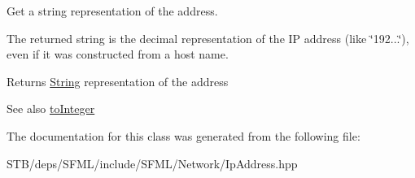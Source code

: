 Get a string representation of the address. 

The returned string is the decimal representation of the I\+P address (like \char`\"{}192...\char`\"{}), even if it was constructed from a host name.

\begin{DoxyReturn}{Returns}
\hyperlink{classsf_1_1_string}{String} representation of the address
\end{DoxyReturn}
\begin{DoxySeeAlso}{See also}
\hyperlink{classsf_1_1_ip_address_af42678b08b23def2560aed7d98b24d89}{to\+Integer} 
\end{DoxySeeAlso}


The documentation for this class was generated from the following file\+:\begin{DoxyCompactItemize}
\item 
S\+T\+B/deps/\+S\+F\+M\+L/include/\+S\+F\+M\+L/\+Network/Ip\+Address.\+hpp\end{DoxyCompactItemize}
